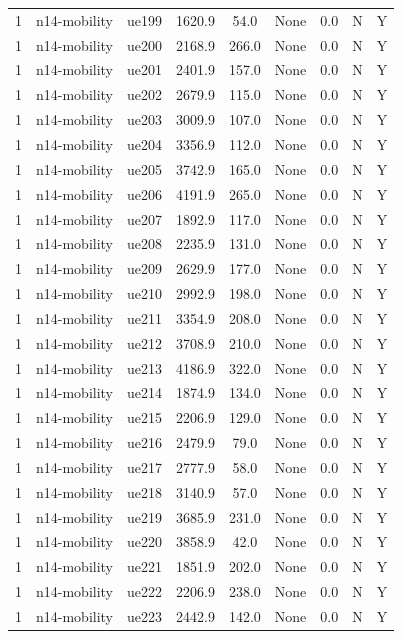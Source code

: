 \begin{table}[ht]
\begin{tabular}{|c|c|c|c|c|c|c|c|c|}
1 & n14-mobility & ue199 & 1620.9 & 54.0 & None & 0.0 & N & Y \\
1 & n14-mobility & ue200 & 2168.9 & 266.0 & None & 0.0 & N & Y \\
1 & n14-mobility & ue201 & 2401.9 & 157.0 & None & 0.0 & N & Y \\
1 & n14-mobility & ue202 & 2679.9 & 115.0 & None & 0.0 & N & Y \\
1 & n14-mobility & ue203 & 3009.9 & 107.0 & None & 0.0 & N & Y \\
1 & n14-mobility & ue204 & 3356.9 & 112.0 & None & 0.0 & N & Y \\
1 & n14-mobility & ue205 & 3742.9 & 165.0 & None & 0.0 & N & Y \\
1 & n14-mobility & ue206 & 4191.9 & 265.0 & None & 0.0 & N & Y \\
1 & n14-mobility & ue207 & 1892.9 & 117.0 & None & 0.0 & N & Y \\
1 & n14-mobility & ue208 & 2235.9 & 131.0 & None & 0.0 & N & Y \\
1 & n14-mobility & ue209 & 2629.9 & 177.0 & None & 0.0 & N & Y \\
1 & n14-mobility & ue210 & 2992.9 & 198.0 & None & 0.0 & N & Y \\
1 & n14-mobility & ue211 & 3354.9 & 208.0 & None & 0.0 & N & Y \\
1 & n14-mobility & ue212 & 3708.9 & 210.0 & None & 0.0 & N & Y \\
1 & n14-mobility & ue213 & 4186.9 & 322.0 & None & 0.0 & N & Y \\
1 & n14-mobility & ue214 & 1874.9 & 134.0 & None & 0.0 & N & Y \\
1 & n14-mobility & ue215 & 2206.9 & 129.0 & None & 0.0 & N & Y \\
1 & n14-mobility & ue216 & 2479.9 & 79.0 & None & 0.0 & N & Y \\
1 & n14-mobility & ue217 & 2777.9 & 58.0 & None & 0.0 & N & Y \\
1 & n14-mobility & ue218 & 3140.9 & 57.0 & None & 0.0 & N & Y \\
1 & n14-mobility & ue219 & 3685.9 & 231.0 & None & 0.0 & N & Y \\
1 & n14-mobility & ue220 & 3858.9 & 42.0 & None & 0.0 & N & Y \\
1 & n14-mobility & ue221 & 1851.9 & 202.0 & None & 0.0 & N & Y \\
1 & n14-mobility & ue222 & 2206.9 & 238.0 & None & 0.0 & N & Y \\
1 & n14-mobility & ue223 & 2442.9 & 142.0 & None & 0.0 & N & Y \\

\end{tabular}
\end{table}
